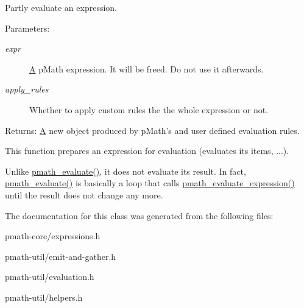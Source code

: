 Partly evaluate an expression. 

\begin{Desc}
\item[Parameters:]
\begin{description}
\item[{\em expr}]\hyperlink{class_a}{A} pMath expression. It will be freed. Do not use it afterwards. \item[{\em apply\_\-rules}]Whether to apply custom rules the the whole expression or not. \end{description}
\end{Desc}
\begin{Desc}
\item[Returns:]\hyperlink{class_a}{A} new object produced by pMath's and user defined evaluation rules.\end{Desc}
This function prepares an expression for evaluation (evaluates its items, ...). \par
 Unlike \hyperlink{classpmath__t_d95c86ef0de178de4d3560518c8a8157}{pmath\_\-evaluate()}, it does not evaluate its result. In fact, \hyperlink{classpmath__t_d95c86ef0de178de4d3560518c8a8157}{pmath\_\-evaluate()} is basically a loop that calls \hyperlink{classpmath__expr__t_d723e196e3d7f9078729bc0fb2fe7eed}{pmath\_\-evaluate\_\-expression()} until the result does not change any more. 

The documentation for this class was generated from the following files:\begin{CompactItemize}
\item 
pmath-core/expressions.h\item 
pmath-util/emit-and-gather.h\item 
pmath-util/evaluation.h\item 
pmath-util/helpers.h\end{CompactItemize}
